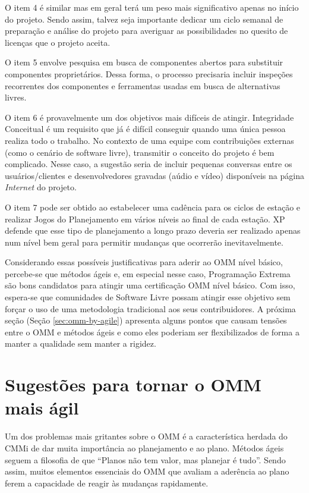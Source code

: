 O item 4 é similar mas em geral terá um peso mais significativo apenas
no início do projeto. Sendo assim, talvez seja importante dedicar um
ciclo semanal de preparação e análise do projeto para averiguar as
possibilidades no quesito de licenças que o projeto aceita.

O item 5 envolve pesquisa em busca de componentes abertos para
substituir componentes proprietários. Dessa forma, o processo
precisaria incluir inspeções recorrentes dos componentes e ferramentas
usadas em busca de alternativas livres.

O item 6 é provavelmente um dos objetivos mais difíceis de
atingir. Integridade Conceitual é um requisito que já é difícil
conseguir quando uma única pessoa realiza todo o trabalho. No contexto
de uma equipe com contribuições externas (como o cenário de software
livre), transmitir o conceito do projeto é bem complicado. Nesse caso,
a sugestão seria de incluir pequenas conversas entre os
usuários/clientes e desenvolvedores gravadas (aúdio e vídeo)
disponíveis na página \textit{Internet} do projeto.

O item 7 pode ser obtido ao estabelecer uma cadência para os ciclos de
estação e realizar Jogos do Planejamento em vários níveis ao final de
cada estação. XP defende que esse tipo de planejamento a longo prazo
deveria ser realizado apenas num nível bem geral para permitir
mudanças que ocorrerão inevitavelmente.

Considerando essas possíveis justificativas para aderir ao OMM nível
básico, percebe-se que métodos ágeis e, em especial nesse caso,
Programação Extrema são bons candidatos para atingir uma certificação
OMM nível básico. Com isso, espera-se que comunidades de Software
Livre possam atingir esse objetivo sem forçar o uso de uma metodologia
tradicional aos seus contribuidores. A próxima seção (Seção
\ref{sec:omm-by-agile}) apresenta alguns pontos que causam tensões
entre o OMM e métodos ágeis e como eles poderiam ser flexibilizados de
forma a manter a qualidade sem manter a rigidez.

\section{Sugestões para tornar o OMM mais ágil}
\label{sec:oom-by-agile}

Um dos problemas mais gritantes sobre o OMM é a característica herdada
do CMMi de dar muita importância ao planejamento e ao plano. Métodos
ágeis seguem a filosofia de que ``Planos não tem valor, mas planejar é
tudo''. Sendo assim, muitos elementos essenciais do OMM que avaliam a
aderência ao plano ferem a capacidade de reagir às mudanças rapidamente.